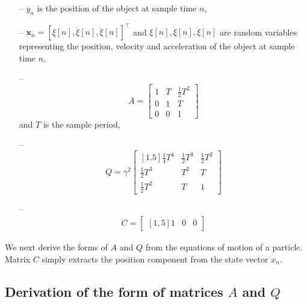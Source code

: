 \documentclass[fleqn,12pt]{article}
\begin{document}
\begin{itemize}

    \item[--] $y_n$ is the position of the object at sample time $n$,

    \item[--]
        $\mathbf{x}_n=\left[\xi[n],\dot{\xi}[n],\ddot{\xi}[n]\right]^\intercal$
        and $\xi[n],\dot{\xi}[n],\ddot{\xi}[n]$ are random variables representing
        the position, velocity and acceleration of the object at sample time
        $n$,

    \item[--]
        \begin{equation}
            A=\begin{bmatrix}
                1 & T & \frac{1}{2}T^2\\
                0 & 1 & T\\
                0 & 0 & 1
            \end{bmatrix}
            \label{eq:A}
        \end{equation}
        and $T$ is the sample period,

    \item[--]
        \begin{equation}
            Q=\gamma^2\begin{bmatrix}[1.5]
                \frac{1}{4}T^4&\frac{1}{2}T^3&\frac{1}{2}T^2\\
                \frac{1}{2}T^3&T^2&T\\
                \frac{1}{2}T^2&T&1
            \end{bmatrix}
            \label{eq:Q}
        \end{equation}

    \item[--]
        \begin{align*}
            C=\begin{bmatrix}[1,5]
                1 & 0 &0
            \end{bmatrix}
        \end{align*}
\end{itemize}

We next derive the forms of $A$ and $Q$ from the equations of motion of a
particle. Matrix $C$ simply extracts the position component from the state
vector $x_n$.

\subsection*{Derivation of the form of matrices $A$ and $Q$}
\end{document}
